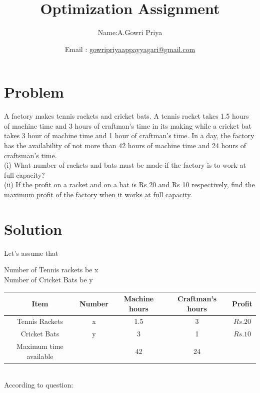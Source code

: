 \documentclass[10pt, a4paper]{article}
\begin{document}
\title{Optimization Assignment}
\author{Name:A.Gowri Priya\and Email :  \url{gowripriyaappayyagari@gmail.com}}
\date{}
\maketitle
  \section{Problem}
A factory makes tennis rackets and cricket bats. A tennis racket takes 1.5 hours of machine time and 3 hours of
craftman’s time in its making while a cricket bat takes 3 hour of machine time and 1 hour of craftman’s time. In a
day, the factory has the availability of not more than 42 hours of machine time and 24 hours of craftsman’s time.\\
(i) What number of rackets and bats must be made if the factory is to work at full capacity?\\
(ii) If the profit on a racket and on a bat is Rs 20 and Rs 10 respectively, find the maximum profit of the factory when
it works at full capacity.

\section{Solution}
Let's assume that
\begin{center}
Number of Tennis rackets be x\\
Number of Cricket Bats be y\\
\end{center}
\begin{tabular}{|c|c|c|c|c|}
	\hline
	\textbf{Item}&\textbf{Number}&\textbf{Machine hours}&\textbf{Craftman's hours}&\textbf{Profit}\\
	\hline
	Tennis Rackets&x&1.5&3&$Rs.20$\\
	\hline
	Cricket Bats&y&3&1&$Rs.10$\\
	\hline
	Maximum time available& &42&24\\
	\hline
\end{tabular}\\
According to question:
\end{document}

